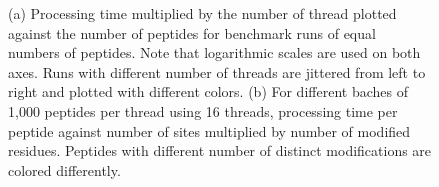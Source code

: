 \documentclass[]{article}
\begin{document}



\begin{figure}[!ht]
	\hfill
	\caption{(a) Processing time multiplied by the number of thread plotted against the number of peptides for benchmark runs of equal numbers of peptides. Note that logarithmic scales are used on both axes. Runs with different number of threads are jittered from left to right and plotted with different colors. (b) For different baches of 1,000 peptides per thread using 16 threads, processing time per peptide against number of sites multiplied by number of modified residues. Peptides with different number of distinct modifications are colored differently.}
	\label{fig:performance_test}
\end{figure}
\end{document}
